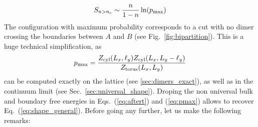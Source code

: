 \documentclass[11pt]{iopart}
\begin{document}
\begin{equation}\label{eq:aftert}
 S_{n>n_c}\sim \frac{n}{1-n}\ln (p_{\rm max})
\end{equation}
The configuration with maximum probability corresponds to a cut with no dimer crossing the boundaries between $A$ and $B$ (see Fig.~\ref{fig:bipartition}). This is a huge technical simplification, as
\begin{equation}\label{eq:pmax}
 p_{\rm max}=\frac{Z_{\rm cyl}(L_x,\ell_y)Z_{\rm cyl}(L_x,L_y-\ell_y)}{Z_{\rm torus}(L_x,L_y)}
\end{equation}
can be computed exactly on the lattice (see \ref{sec:dimers_exact}), as well as in the continuum limit (see Sec.~\ref{sec:universal_shape}). Droping the non universal bulk and boundary free energies in Eqs.~(\ref{eq:aftert}) and (\ref{eq:pmax}) allows to recover Eq.~(\ref{eq:shape_general}). Before going any further, let us make the following remarks:
\end{document}
